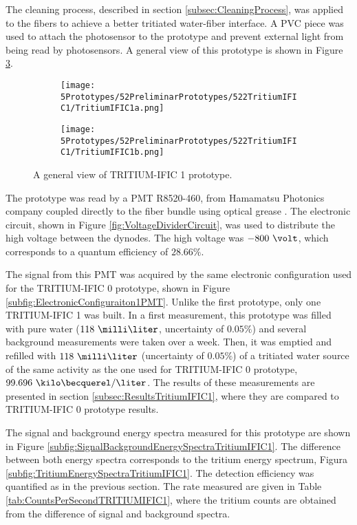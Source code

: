The cleaning process, described in section \ref{subsec:CleaningProcess}, was applied to the fibers to achieve a better tritiated water-fiber interface. A PVC piece was used to attach the photosensor to the prototype and prevent external light from being read by photosensors. A general view of this prototype is shown in Figure \ref{fig:TritumIFIC1}.

\begin{figure}
\centering
    \begin{subfigure}[b]{0.40\textwidth}
    \centering
    \texttt{[image: 5Prototypes/52PreliminarPrototypes/522TritiumIFIC1/TritiumIFIC1a.png]}  
    \caption{\label{subfig:TritumIFIC1a}}
    \end{subfigure}
    \hfill
    \begin{subfigure}[b]{0.40\textwidth}
    \centering
    \texttt{[image: 5Prototypes/52PreliminarPrototypes/522TritiumIFIC1/TritiumIFIC1b.png]}  
    \caption{\label{subfig:TritumIFIC1b}}
    \end{subfigure}
 \caption{A general view of TRITIUM-IFIC 1 prototype.}
 \label{fig:TritumIFIC1}
\end{figure}

The prototype was read by a PMT R8520-460, from Hamamatsu Photonics company \cite{DataSheetPMTs} coupled directly to the fiber bundle using optical grease \cite{OpticalGrease}. The electronic circuit, shown in Figure \ref{fig:VoltageDividerCircuit}, was used to distribute the high voltage between the dynodes. The high voltage was $-800~\volt$, which corresponds to a quantum efficiency of $28.66\%$.

The signal from this PMT was acquired by the same electronic configuration used for the TRITIUM-IFIC 0 prototype, shown in Figure \ref{subfig:ElectronicConfiguraiton1PMT}. Unlike the first prototype, only one TRITIUM-IFIC 1 was built. In a first measurement, this prototype was filled with pure water ($118~\milli\liter$, uncertainty of $0.05\%$) and several background measurements were taken over a week. Then, it was emptied and refilled with $118~\milli\liter$ (uncertainty of $0.05\%$) of a tritiated water source of the same activity as the one used for TRITIUM-IFIC 0 prototype, $99.696~\kilo\becquerel/\liter$. The results of these measurements are presented in section \ref{subsec:ResultsTritiumIFIC1}, where they are compared to TRITIUM-IFIC 0 prototype results.

The signal and background energy spectra measured for this prototype are shown in Figure \ref{subfig:SignalBackgroundEnergySpectraTritiumIFIC1}. The difference between both energy spectra corresponds to the tritium energy spectrum, Figura \ref{subfig:TritiumEnergySpectraTritiumIFIC1}. The detection efficiency was quantified as in the previous section. The rate measured are given in Table \ref{tab:CountsPerSecondTRITIUMIFIC1}, where the tritium counts are obtained from the difference of signal and background spectra.

